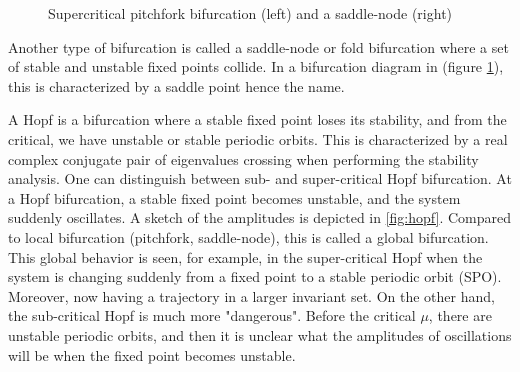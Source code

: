 \begin{figure}[ht]
\centering
\begin{subfigure}[t]{0.3\textwidth}
  \centering
\end{subfigure}
\hspace{0.1\textwidth}
\begin{subfigure}[t]{0.3\textwidth}
  \centering
\end{subfigure}
\caption{Supercritical pitchfork bifurcation (left) and a saddle-node (right)}
  \label{fig:pitch_saddle}
\end{figure}

Another type of bifurcation is called a saddle-node or fold bifurcation where a
set of stable and unstable fixed points collide. In a bifurcation diagram in
(figure \ref{fig:pitch_saddle}), this is characterized by a saddle point hence
the name.

A Hopf is a bifurcation where a stable fixed point loses its stability, and
from the critical, we have unstable or stable periodic orbits. This is
characterized by a real complex conjugate pair of eigenvalues crossing when
performing the stability analysis. One can distinguish between sub- and
super-critical Hopf bifurcation. At a Hopf bifurcation, a stable fixed point
becomes unstable, and the system suddenly oscillates. A sketch of the
amplitudes is depicted in \ref{fig:hopf}. Compared
to local bifurcation (pitchfork, saddle-node), this is called a global
bifurcation. This global behavior is seen, for example, in the super-critical
Hopf when the system is changing suddenly from a fixed point to a stable
periodic orbit (SPO). Moreover, now having a trajectory in a larger invariant
set. On the other hand, the sub-critical Hopf is much more "dangerous". Before
the critical $\mu$, there are unstable periodic orbits, and then it is unclear
what the amplitudes of oscillations will be when the fixed point becomes
unstable.

